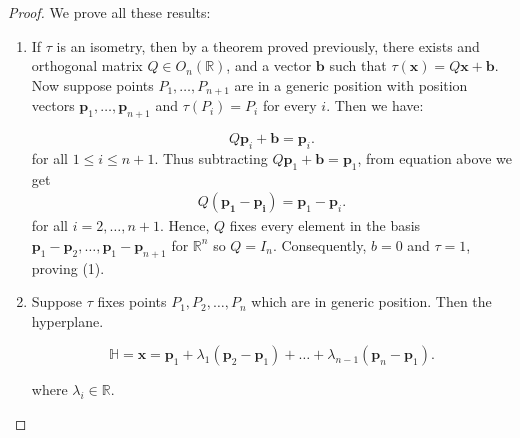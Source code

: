 \begin{proof}
  We prove all these results:
  \begin{enumerate}
    \item If \( \tau   \) is an isometry, then by a theorem proved previously, there exists
      and orthogonal matrix \( Q \in O_{n}\left(\mathbb{R}  \right) \), and a vector \( \mathbf{b} \) such that \( \tau \left( \mathbf{x} \right) = Q \mathbf{x} + \mathbf{b}\). Now suppose points
      \( P_{1}, \ldots , P_{n+1} \) are in a generic position with position vectors
      \( \mathbf{p}_1, \ldots , \mathbf{p}_{n+1} \) and \( \tau \left( P_{i} \right) = P_{i} \) for every \( i \). Then we have:

      \[
        Q \mathbf{p}_i + \mathbf{b} = \mathbf{p}_i
      .\] 
      for all \( 1 \le i \le n + 1 \). Thus subtracting \( Q\mathbf{p}_1 + \mathbf{b} = \mathbf{p}_{1} \), from equation above we get 
      \begin{align*}
        Q(\mathbf{p_1} - \mathbf{p_i}) = \mathbf{p}_1 - \mathbf{p}_{i} 
      .\end{align*}
        for all \( i = 2, \ldots , n+1 \). Hence, \( Q \) fixes every element in
        the basis \( \mathbf{p}_1 - \mathbf{p}_2, \ldots , \mathbf{p}_1 - \mathbf{p}_{n+1} \) for \( \mathbb{R}^{n} \) so
        \( Q = I_{n} \). Consequently, \( b = 0 \) and \( \tau = 1 \), proving (1).
  \item Suppose \( \tau  \) fixes points \( P_{1}, P_{2}, \ldots , P_{n} \) which are in generic position.
    Then the hyperplane.

    \[
      \mathbb{H} = \mathbf{x} = \mathbf{p}_1 + \lambda_{1} \left( \mathbf{p}_2 - \mathbf{p}_1 \right) + \ldots + \lambda_{n-1} \left(\mathbf{p}_n -\mathbf{p}_1 \right)
    .\] 

    where \( \lambda_{i} \in \mathbb{R} \).


\end{enumerate}
\end{proof}
